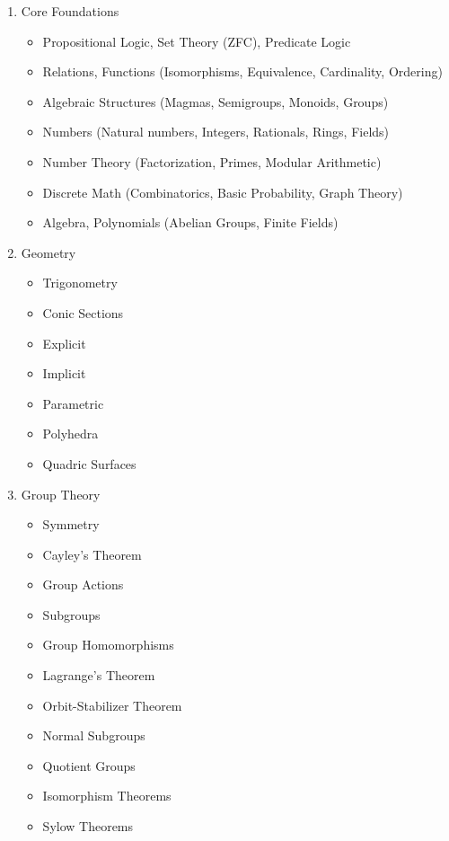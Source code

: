 \documentclass[12pt]{article}
\begin{document}
\begin{enumerate}
    \item Core Foundations
    \begin{itemize}
        \item Propositional Logic, Set Theory (ZFC), Predicate Logic
        \item Relations, Functions (Isomorphisms, Equivalence, Cardinality, Ordering)
        \item Algebraic Structures (Magmas, Semigroups, Monoids, Groups)
        \item Numbers (Natural numbers, Integers, Rationals, Rings, Fields)
        \item Number Theory (Factorization, Primes, Modular Arithmetic)
        \item Discrete Math (Combinatorics, Basic Probability, Graph Theory)
        \item Algebra, Polynomials (Abelian Groups, Finite Fields)
    \end{itemize}

    \item Geometry 
    \begin{itemize}
        \item Trigonometry
        \item Conic Sections
        \item Explicit
        \item Implicit
        \item Parametric
        \item Polyhedra
        \item Quadric Surfaces
    \end{itemize}

    \item Group Theory 
    \begin{itemize}
        \item Symmetry
        \item Cayley's Theorem
        \item Group Actions
        \item Subgroups
        \item Group Homomorphisms
        \item Lagrange's Theorem
        \item Orbit-Stabilizer Theorem
        \item Normal Subgroups
        \item Quotient Groups
        \item Isomorphism Theorems
        \item Sylow Theorems
    \end{itemize}


\end{enumerate}
\end{document}
